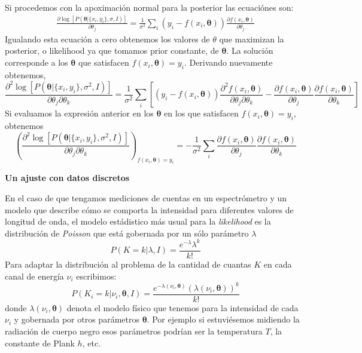 \documentclass[aps,onecolumn,12pt,notitlepage]{revtex4-1}
\begin{document}
Si procedemos con la apoximación normal para la posterior las ecuaciónes son:
\begin{align}
\frac{ \partial \log \left[P \left( \boldsymbol{\theta} | \{ x_{i},y_{i} \},\sigma ,I \right)\right]}{ \partial \theta_{j}}  = \frac{1}{\sigma^2} \sum_{i} \left(y_{i} - f(x_{i},\boldsymbol{\theta})\right)\frac{\partial f(x_{i},\boldsymbol{\theta})}{\partial \theta_{j}}
\end{align}
Igualando esta ecuación a cero obtenemos los valores de $\theta$ que maximizan la posterior, o likelihood ya que tomamos prior constante, de $\boldsymbol{\theta}$. La solución corresponde a los $\boldsymbol{\theta}$ que satisfacen $f(x_{i},\boldsymbol{\theta}) = y_{i}$. 
Derivando nuevamente obtenemos,
\begin{equation}
\frac{\partial^{2} \log \left[P\left(\boldsymbol{\theta} | \{ x_{i},y_{i} \},\sigma^{2},I \right)\right]}{ \partial \theta_{j} \partial \theta_{k}} = \frac{1}{\sigma^2} \sum_{i} \left[ \left(y_{i} - f(x_{i},\boldsymbol{\theta})\right) \frac{\partial^2 f(x_{i},\boldsymbol{\theta})}{\partial \theta_{j} \partial \theta_{k}}  - \frac{\partial f(x_{i},\boldsymbol{\theta})}{\partial \theta_{j}} \frac{\partial f(x_{i},\boldsymbol{\theta})}{\partial \theta_{k}}\right]
\end{equation}
Si evaluamos la expresión anterior en los $\boldsymbol{\theta}$ en los que satisfacen $f(x_{i},\boldsymbol{\theta}) = y_{i}$, obtenemos
\begin{equation}
\left( \frac{\partial^{2} \log \left[P\left(\boldsymbol{\theta} | \{ x_{i},y_{i} \},\sigma^{2},I \right)\right]}{ \partial \theta_{j} \partial \theta_{k}} \right)_{f(x_{i},\boldsymbol{\theta}) = y_{i}}  = -\frac{1}{\sigma^2} \sum_{i} \frac{\partial f(x_{i},\boldsymbol{\theta})}{\partial \theta_{j}} \frac{\partial f(x_{i},\boldsymbol{\theta})}{\partial \theta_{k}}
\end{equation}

\textbf{Un ajuste con datos discretos}

En el caso de que tengamos mediciones de cuentas en un espectrómetro y un modelo que describe cómo se comporta la intensidad para diferentes valores de longitud de onda, el modelo estádistico más usual para la \textit{likelihood} es la distribución de \textit{ Poisson} que está gobernada por un sólo parámetro $\lambda$
\begin{equation}
P(K = k|\lambda,I) = \frac{e^{-\lambda} \lambda^k}{k!}
\end{equation}
Para adaptar la distribución al problema de la cantidad  de cuantas $K$ en cada canal de energía $\nu_{i}$ escribimos:
\begin{equation}
P\left(K_{i} = k|\nu_{i},\boldsymbol{\theta},I\right) = \frac{e^{-\lambda(\nu_{i},\boldsymbol{\theta})} \left(\lambda(\nu_{i},\boldsymbol{\theta})\right)^k}{k!}
\end{equation}
donde $\lambda(\nu_{i},\boldsymbol{\theta})$ denota el modelo físico que tenemos para la intensidad de cada $\nu_{i}$ y gobernada por otros parámetros $\boldsymbol{\theta}$. Por ejemplo si estuviésemos midiendo la radiación de cuerpo negro esos parámetros podrían ser la temperatura $T$, la constante de Plank $h$, etc.
\end{document}

